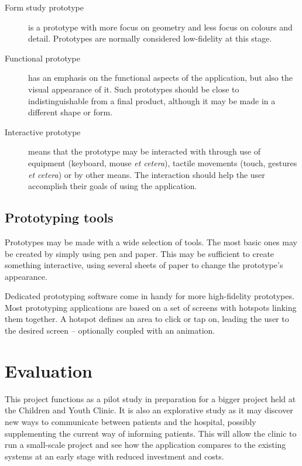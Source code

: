 \begin{description}
    \item[Form study prototype] is a prototype with more focus on geometry and less focus on colours and detail. Prototypes are normally considered low-fidelity at this stage.
    \item[Functional prototype] has an emphasis on the functional aspects of the application, but also the visual appearance of it. Such prototypes should be close to indistinguishable from a final product, although it may be made in a different shape or form.
    \item[Interactive prototype] means that the prototype may be interacted with through use of equipment (keyboard, mouse \emph{et cetera}), tactile movements (touch, gestures \emph{et cetera}) or by other means. The interaction should help the user accomplish their goals of using the application.
\end{description}

\subsection{Prototyping tools}

Prototypes may be made with a wide selection of tools. The most basic ones may be created by simply using pen and paper. This may be sufficient to create something interactive, using several sheets of paper to change the prototype's appearance.

Dedicated prototyping software come in handy for more high-fidelity prototypes. Most prototyping applications are based on a set of screens with hotspots linking them together. A hotspot defines an area to click or tap on, leading the user to the desired screen -- optionally coupled with an animation.


\section{Evaluation}
\label{sec:evaluation}

This project functions as a pilot study in preparation for a bigger project held at the Children and Youth Clinic. It is also an explorative study as it may discover new ways to communicate between patients and the hospital, possibly supplementing the current way of informing patients. This will allow the clinic to run a small-scale project and see how the application compares to the existing systems at an early stage with reduced investment and costs.

